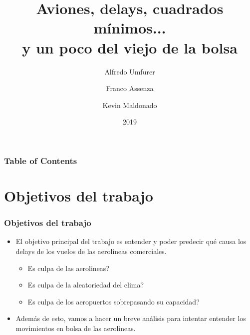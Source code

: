 \documentclass{beamer}
\title{Aviones, delays, cuadrados mínimos...\\ y un poco del viejo de la bolsa}
\author[]{Alfredo Umfurer \and Franco Assenza \and Kevin Maldonado}
\institute{Universidad de Buenos Aires}
\date{2019}
\begin{document}
\frame{\titlepage}

\begin{frame}
\frametitle{Table of Contents}
\tableofcontents
\end{frame}
  
\section{Objetivos del trabajo}  
\begin{frame}
\frametitle{Objetivos del trabajo}
\begin{itemize}
\item El objetivo principal del trabajo es entender y poder predecir qué causa los delays de los vuelos de las aerolineas comerciales.\\
\begin{itemize}
\item<2-> Es culpa de las aerolineas?
\item<3-> Es culpa de la aleatoriedad del clima?
\item<4-> Es culpa de los aeropuertos sobrepasando su capacidad?
\end{itemize}
\item<5-> Además de esto, vamos a hacer un breve análisis para intentar entender los movimientos en bolsa de las aerolineas.
\end{itemize}
\end{frame}
 
\end{document}
